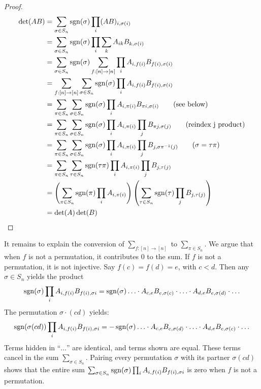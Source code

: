 \begin{proof}
	\begin{align*}
		\det(AB) &= \sum_{\sigma \in S_n} \operatorname{sgn}(\sigma) \prod_i (AB)_{i,\sigma(i)}\\
		 &= \sum_{\sigma \in S_n} \operatorname{sgn}(\sigma) \prod_i \sum_k A_{ik} B_{k,\sigma(i)}\\
		 &= \sum_{\sigma \in S_n} \operatorname{sgn}(\sigma) \sum_{f:[n] \to [n]} \prod_i A_{i,f(i)} B_{f(i),\sigma(i)}\\
		 &=  \sum_{f:[n] \to [n]} \sum_{\sigma \in S_n} \operatorname{sgn}(\sigma)\prod_i A_{i,f(i)} B_{f(i),\sigma(i)}\\
		&= \sum_{\pi \in S_n} \sum_{\sigma \in S_n} \operatorname{sgn}(\sigma) \prod_i A_{i, \pi(i)}B_{\pi i, \sigma(i)} \hspace{2em}\text{(see below)}\\
		&= \sum_{\pi \in S_n} \sum_{\sigma \in S_n} \operatorname{sgn}(\sigma) \prod_i A_{i, \pi(i)}\prod_j B_{\pi j, \sigma(j)} \hspace{2em} \text{(reindex j product)}\\
		&= \sum_{\pi \in S_n} \sum_{\sigma \in S_n} \operatorname{sgn}(\sigma) \prod_i A_{i, \pi(i)}\prod_j B_{j, \sigma\pi^{-1}(j)} \hspace{2em} (\sigma = \tau \pi)\\
		&= \sum_{\pi \in S_n} \sum_{\tau \in S_n} \operatorname{sgn}(\tau\pi) \prod_i A_{i, \pi(i)}\prod_j B_{j, \tau(j)}\\
		&= \left(\sum_{\pi \in S_n} \operatorname{sgn}(\pi) \prod_i A_{i, \pi(i)}\right)\left(\sum_{\tau \in S_n} \operatorname{sgn}(\tau) \prod_j B_{j, \tau(j)}\right)\\
		&= \det(A)\det(B) 
	\end{align*}
\end{proof}

	It remains to explain the conversion of $\sum_{f:[n] \to [n]} $ to $\sum_{\pi \in S_n}$.  We argue that when $f$ is 
	not a permutation, it contributes $0$ to the sum.  If $f$ is not a permutation, it is 
	not injective.  Say $f(c)=f(d) = e$, with $c < d$.  Then any $\sigma \in S_n$ yields the product
	$$\operatorname{sgn}(\sigma)\prod_i A_{i,f(i)} B_{f(i),\sigma i} = \operatorname{sgn}(\sigma) \ldots \cdot A_{c,e}B_{e,\sigma(c)} \cdot \ldots \cdot A_{d,e} B_{e,\sigma(d)}\cdot \ldots$$
	The permutation $\sigma \cdot (cd)$ yields:
	$$\operatorname{sgn}(\sigma(cd))\prod_i A_{i,f(i)} B_{f(i),\sigma i} = -\operatorname{sgn}(\sigma) \ldots \cdot A_{c,e}B_{e,\sigma(d)} \cdot \ldots \cdot A_{d,e} B_{e,\sigma(c)}\cdot \ldots$$
	Terms hidden in ``$\ldots$'' are identical, and terms shown are equal.  These terms cancel in the sum $\sum_{\sigma \in S_n}$.  
	Pairing every permutation $\sigma$ with its partner $\sigma(cd)$ shows that the entire sum 
	$\sum_{\sigma \in S_n} \operatorname{sgn}(\sigma)\prod_i A_{i,f(i)} B_{f(i),\sigma i}$ is zero when $f$ is not a permutation.
